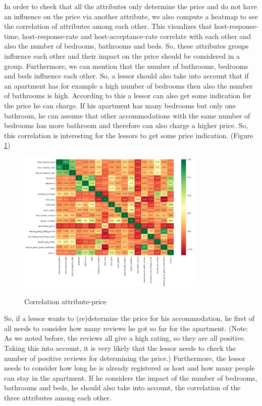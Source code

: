 \documentclass[journal]{IEEEtran}
\begin{document}
In order to check that all the attributes only determine the price and do not have an influence on the price via another attribute, we also compute a heatmap to see the correlation of attributes among each other. This visualizes that host-response-time, host-response-rate and host-acceptance-rate correlate with each other and also the number of bedrooms, bathrooms and beds. So, these attributes groups influence each other and their impact on the price should be considered in a group. Furthermore, we can mention that the number of bathrooms, bedrooms and beds influence each other. So, a lessor should also take into account that if an apartment has for example a high number of bedrooms then also the number of bathrooms is high. According to this a lessor can also get some indication for the price he can charge. If his apartment has many bedrooms but only one bathroom, he can assume that other accommodations with the same number of bedrooms has more bathroom and therefore can also charge a higher price. So, this correlation is interesting for the lessors to get some price indication. (Figure \ref{heatmap })
\begin{figure}
  \begin{center}
  \includegraphics[width=3.5in]{photo/8_heatmap.png}\\
  \caption{Correlation attribute-price}\label{heatmap }
  \end{center}
\end{figure}
So, if a lessor wants to (re)determine the price for his accommodation, he first of all needs to consider how many reviews he got so far for the apartment. (Note: As we noted before, the reviews all give a high rating, so they are all positive. Taking this into account, it is very likely that the lessor needs to check the number of positive reviews for determining the price.) Furthermore, the lessor needs to consider how long he is already registered as host and how many people can stay in the apartment. If he considers the impact of the number of bedrooms, bathrooms and beds, he should also take into account, the correlation of the three attributes among each other.
\end{document}
